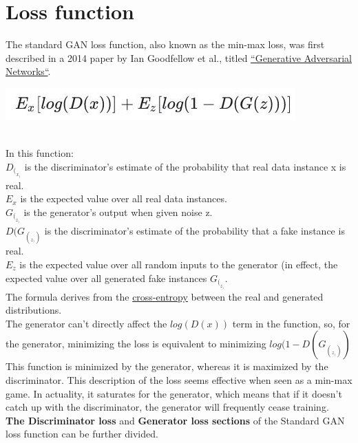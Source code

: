 \documentclass[14pt]{article}
\begin{document}
\section{Loss function}
The standard GAN loss function, also known as the min-max loss, was first described in a 2014 paper by Ian Goodfellow et al., titled \href{https://arxiv.org/abs/1406.2661}{“Generative Adversarial Networks“}.
\\
\begin{center}
    \includegraphics[width = 11 cm ]{7.png}
\end{center}
\\
In this function:\\
\hspace*{0.3cm} $D_(_x_)$ is the discriminator's estimate of the probability that real data instance x is real.
\\
\hspace*{0.3cm} $E_x$ is the expected value over all real data instances.\\
\hspace*{0.3cm} $G_(_z_)$ is the generator's output when given noise z.\\
\hspace*{0.3cm} $D(G_(_z_))$ is the discriminator's estimate of the probability that a fake instance is real.\\
\hspace*{0.3cm} $E_z$ is the expected value over all random inputs to the generator (in effect, the expected value over all generated fake instances $G_(_z_)$.\\
The formula derives from the \href{https://developers.google.com/machine-learning/glossary#cross-entropy
}{cross-entropy} between the real and generated distributions.
\\The generator can't directly affect the $log(D(x))$ term in the function, so, for the generator, minimizing the loss is equivalent to minimizing $log(1 - D(G_(_z_)))$
\\
This function is minimized by the generator, whereas it is maximized by the discriminator. This description of the loss seems effective when seen as a min-max game. In actuality, it saturates for the generator, which means that if it doesn't catch up with the discriminator, the generator will frequently cease training.
\\
\textbf{The Discriminator loss} and \textbf{Generator loss sections} of the Standard GAN loss function can be further divided.
\\
\end{document}
